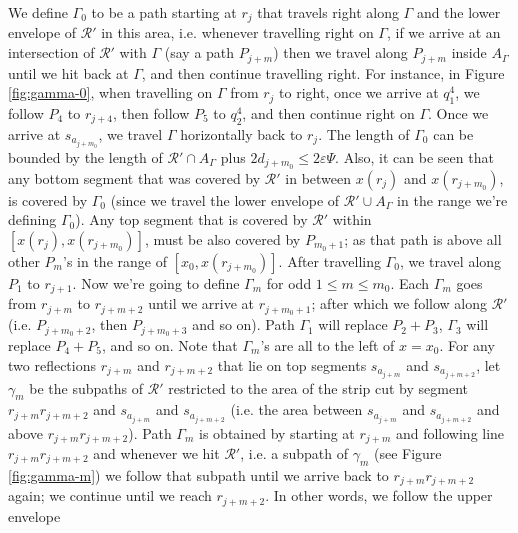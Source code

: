 \documentclass[10pt,a4paper]{amsart}
\theoremstyle{thmstyleone}
\newcommand{\eps}{\varepsilon}
\begin{document}
        We define $\Gamma_0$ to be a path starting at $r_j$ that travels right along $\Gamma$ and the lower envelope of $\mathcal R'$ in this area, i.e. whenever travelling right on $\Gamma$, if we arrive at an intersection of $\mathcal R'$ with $\Gamma$ (say a path $P_{j+m}$) then we travel along $P_{j+m}$ inside $A_{\Gamma}$ until we hit back at $\Gamma$, and then continue travelling right. For instance, in
        Figure \ref{fig:gamma-0}, when travelling on $\Gamma$ from $r_j$ to right, once we arrive at $q^4_1$, we follow $P_4$ to $r_{j+4}$, then follow $P_5$ to $q^4_2$, and then continue right on $\Gamma$. Once we arrive at $s_{a_{j+m_0}}$, we travel $\Gamma$ horizontally back to $r_{j}$. The length of $\Gamma_0$ can be bounded by the length of $\mathcal R'\cap A_{\Gamma}$ plus $2d_{j+m_0}\leq 2\eps\Psi$.
        Also, it can be seen that any bottom segment that was covered by $\mathcal R'$ in between $x(r_j)$ and $x(r_{j+m_0})$, is covered by $\Gamma_0$ (since we travel the lower envelope of $\mathcal R'\cup A_\Gamma$ in the range we're defining $ \Gamma_0 $). Any top segment that is covered by $\mathcal R'$ within $[x(r_j),x(r_{j+m_0})]$, must be also covered by $P_{m_0+1}$; as that path is above all other $P_m$'s in the range of $[x_0, x(r_{j+m_0})]$.   After travelling $\Gamma_0$, we travel along $P_1$ to $r_{j+1}$.
        Now we're going to define $\Gamma_m$ for odd $ 1\le m \le m_0 $. Each $\Gamma_m$ goes from $r_{j + m}$ to $r_{j + m + 2}$ 
        until we arrive at $r_{j+m_0+1}$; after which we follow along $\mathcal R'$ (i.e. $P_{j+m_0+2}$, then $P_{j+m_0+3}$ and so on). Path $\Gamma_1$ will replace $P_2+P_3$, $\Gamma_3$ will replace
        $P_4+P_5$, and so on. Note that $\Gamma_m$'s are all to the left of $x = x_0$.
	   For any two reflections $r_{j + m}$ and $r_{j + m + 2}$ that lie on top segments $s_{a_{j+m}}$ and $s_{a_{j+m + 2}}$, let $\gamma_m$ be the subpaths of $\mathcal R'$ restricted to the area of the strip cut by segment $r_{j + m}r_{j + m + 2}$ and $s_{a_{j+m}}$ and $s_{a_{j+m + 2}}$ (i.e. the area between $s_{a_{j+m}}$ and $s_{a_{j+m + 2}}$ and above $r_{j+m}r_{j + m + 2}$). Path $\Gamma_m$ is obtained by starting at $r_{j+m}$ and following line $r_{j + m}r_{j + m + 2}$ and whenever we hit $\mathcal R'$, i.e. a subpath of $\gamma_m$ (see Figure \ref{fig:gamma-m}) we follow that subpath until we arrive back to $r_{j+m}r_{j+m+2}$ again; we continue until we reach $r_{j+m+2}$. In other words, we follow the upper envelope
\end{document}
